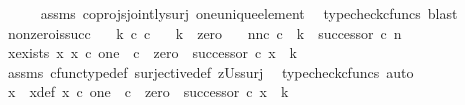 \begin{isabellebody}
\ \ \ \ \isamarkupfalse%
\ assms\ coprojs{\isacharunderscore}{\kern0pt}jointly{\isacharunderscore}{\kern0pt}surj\ one{\isacharunderscore}{\kern0pt}unique{\isacharunderscore}{\kern0pt}element\ \isamarkupfalse%
\ {\isacharparenleft}{\kern0pt}typecheck{\isacharunderscore}{\kern0pt}cfuncs{\isacharcomma}{\kern0pt}\ blast{\isacharparenright}{\kern0pt}\isanewline
{}\isamarkupfalse%
%
\endisatagproof
{\isafoldproof}%
%
\isadelimproof
\isanewline
%
\endisadelimproof
\isanewline
{}\isamarkupfalse%
\ nonzero{\isacharunderscore}{\kern0pt}is{\isacharunderscore}{\kern0pt}succ{\isacharcolon}{\kern0pt}\isanewline
\ \ \ {\isachardoublequoteopen}k\ {\isasymin}\isactrlsub c\ {\isasymnat}\isactrlsub c{\isachardoublequoteclose}\isanewline
\ \ \ {\isachardoublequoteopen}k\ {\isasymnoteq}\ zero{\isachardoublequoteclose}\isanewline
\ \ \ {\isachardoublequoteopen}{\isasymexists}n{\isachardot}{\kern0pt}{\isacharparenleft}{\kern0pt}n{\isasymin}\isactrlsub c\ {\isasymnat}\isactrlsub c\ {\isasymand}\ k\ {\isacharequal}{\kern0pt}\ successor\ {\isasymcirc}\isactrlsub c\ n{\isacharparenright}{\kern0pt}{\isachardoublequoteclose}\isanewline
%
\isadelimproof
%
\endisadelimproof
%
\isatagproof
{}\isamarkupfalse%
\ {\isacharminus}{\kern0pt}\ \isanewline
\ \ \isamarkupfalse%
\ x{\isacharunderscore}{\kern0pt}exists{\isacharcolon}{\kern0pt}\ {\isachardoublequoteopen}{\isasymexists}x{\isachardot}{\kern0pt}\ {\isacharparenleft}{\kern0pt}{\isacharparenleft}{\kern0pt}x\ {\isasymin}\isactrlsub c\ one\ {\isasymCoprod}\ {\isasymnat}\isactrlsub c{\isacharparenright}{\kern0pt}\ {\isasymand}\ {\isacharparenleft}{\kern0pt}zero\ {\isasymamalg}\ successor\ {\isasymcirc}\isactrlsub c\ x\ {\isacharequal}{\kern0pt}\ k{\isacharparenright}{\kern0pt}{\isacharparenright}{\kern0pt}{\isachardoublequoteclose}\isanewline
\ \ \ \ \isamarkupfalse%
\ assms\ cfunc{\isacharunderscore}{\kern0pt}type{\isacharunderscore}{\kern0pt}def\ surjective{\isacharunderscore}{\kern0pt}def\ zUs{\isacharunderscore}{\kern0pt}surj\ \isamarkupfalse%
\ {\isacharparenleft}{\kern0pt}typecheck{\isacharunderscore}{\kern0pt}cfuncs{\isacharcomma}{\kern0pt}\ auto{\isacharparenright}{\kern0pt}\isanewline
\ \ \isamarkupfalse%
\ x\ \ x{\isacharunderscore}{\kern0pt}def{\isacharcolon}{\kern0pt}\ {\isachardoublequoteopen}{\isacharparenleft}{\kern0pt}{\isacharparenleft}{\kern0pt}x\ {\isasymin}\isactrlsub c\ one\ {\isasymCoprod}\ {\isasymnat}\isactrlsub c{\isacharparenright}{\kern0pt}\ {\isasymand}\ {\isacharparenleft}{\kern0pt}zero\ {\isasymamalg}\ successor\ {\isasymcirc}\isactrlsub c\ x\ {\isacharequal}{\kern0pt}\ k{\isacharparenright}{\kern0pt}{\isacharparenright}{\kern0pt}{\isachardoublequoteclose}\isanewline

\end{isabellebody}
